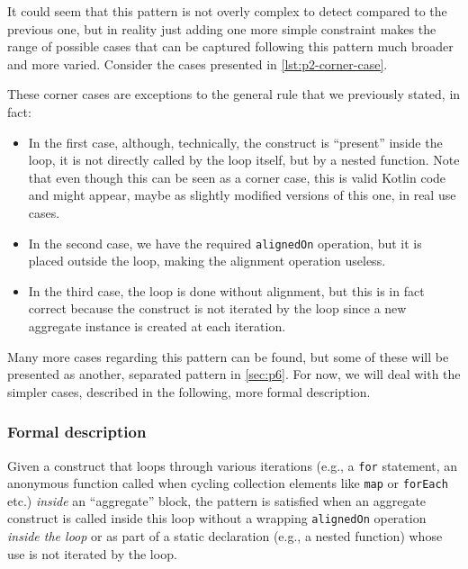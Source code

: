 \documentclass[12pt,a4paper,openright,twoside]{book}
\begin{document}
It could seem that this pattern is not overly complex to detect compared to the
previous one, but in reality just adding one more simple constraint makes the
range of possible cases that can be captured following this pattern much broader
and more varied. Consider the cases presented in \cref{lst:p2-corner-case}. 

These corner cases are exceptions to the general rule that we previously stated,
in fact:
\begin{itemize}
  \item In the first case, although, technically, the construct is ``present''
  inside the loop, it is not directly called by the loop itself, but by a nested
  function. Note that even though this can be seen as a corner case, this is
  valid Kotlin code and might appear, maybe as slightly modified versions of
  this one, in real use cases.
  \item In the second case, we have the required \lstinline{alignedOn}
  operation, but it is placed outside the loop, making the alignment operation
  useless.
  \item In the third case, the loop is done without alignment, but this is in
  fact correct because the construct is not iterated by the loop since a new 
  aggregate instance is created at each iteration.
\end{itemize}

Many more cases regarding this pattern can be found, but some of these will be
presented as another, separated pattern in \cref{sec:p6}. For now, we will deal
with the simpler cases, described in the following, more formal description.

\subsubsection{Formal description}

Given a construct that loops through various iterations (e.g., a \lstinline{for}
statement, an anonymous function called when cycling collection elements like
\lstinline{map} or \lstinline{forEach} etc.) \emph{inside} an ``aggregate'' block,
the pattern is satisfied when an aggregate construct is called inside this loop
without a wrapping \lstinline{alignedOn} operation \emph{inside the loop} or as
part of a static declaration (e.g., a nested function) whose use is not iterated
by the loop.
\end{document}
